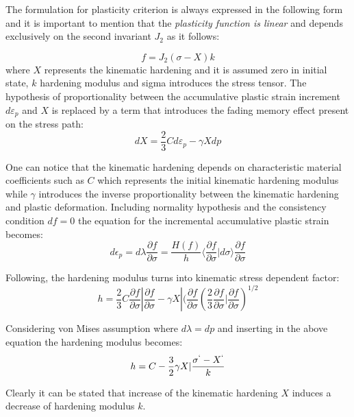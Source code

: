\documentclass[10pt,a4paper]{report}
\begin{document}
The formulation for plasticity criterion is always expressed in the following form and it is important to mention that the\textit{ plasticity function is linear} and depends exclusively on the second invariant $J_2$ as it follows:

\begin{equation}
	f=J_2(\sigma-X)k
\end{equation}
where $X$ represents the kinematic hardening and it is assumed zero in initial state, $k$ hardening modulus and sigma introduces the stress tensor. The hypothesis of proportionality between the accumulative plastic strain increment $d\varepsilon_p$ and $X$ is replaced by a term that introduces the fading memory effect present on the stress path:
\begin{equation}
	dX=\frac{2}{3}Cd\varepsilon_p - \gamma Xdp
\end{equation}

One can notice that the kinematic hardening depends on characteristic material coefficients such as $C$ which represents the initial kinematic hardening modulus while $\gamma$ introduces the inverse proportionality between the kinematic hardening and plastic deformation. Including normality hypothesis and the consistency condition $df=0$ the equation for the incremental accumulative plastic strain becomes:
\begin{equation}
	d\epsilon_p=d\lambda\frac{\partial f}{\partial \sigma}=\frac{H(f)}{h}\langle\frac{\partial f}{\partial \sigma}|d\sigma \rangle \frac{\partial f}{\partial\sigma}
\end{equation}

Following, the hardening modulus turns into kinematic stress dependent factor:
\begin{equation}
	h=\frac{2}{3}C \frac{\partial f}{\partial\sigma}|\frac{\partial f}{\partial\sigma} - \gamma X | (\frac{\partial f}{\partial\sigma}(\frac{2}{3}\frac{\partial f}{\partial\sigma}|\frac{\partial f}{\partial\sigma})^{1/2}
\end{equation}

Considering von Mises assumption where $d\lambda =dp$ and inserting in the above equation the hardening modulus becomes:
\begin{equation}
h=C-\frac{3}{2}\gamma X|\frac{\sigma^` - X^`}{k}
\end{equation}

Clearly it can be stated that increase of the kinematic hardening $X$ induces a decrease of hardening modulus $k$. 
\end{document}
